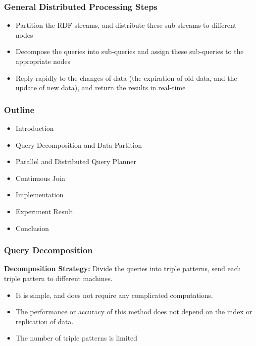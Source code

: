 \begin{frame}
\frametitle{General Distributed Processing Steps}
\begin{itemize}
\item Partition the RDF streams, and distribute these sub-streams to different nodes
\item Decompose the queries into sub-queries and assign these sub-queries to the appropriate nodes
\item Reply rapidly to the changes of data (the expiration of old data, and the update of new data), and return the results in real-time
\end{itemize}
\end{frame}


\begin{frame}
\frametitle{Outline}
	\begin{itemize}
		\item Introduction
		\item Query Decomposition and Data Partition
		\item \textcolor{blue!20}{Parallel and Distributed Query Planner}
		\item \textcolor{blue!20}{Continuous Join}
		\item \textcolor{blue!20}{Implementation}
		\item \textcolor{blue!20}{Experiment Result}
		\item \textcolor{blue!20}{Conclusion}
	\end{itemize}
\end{frame}

\begin{frame}
\frametitle{Query Decomposition}
\textbf{Decomposition Strategy: }Divide the queries into triple patterns, send each triple pattern to different machines.
\begin{itemize}
\item It is simple, and does not require any complicated computations.
\item The performance or accuracy of this method does not depend on the index or replication of data.
\item The number of triple patterns is limited

\end{itemize}

\end{frame}

